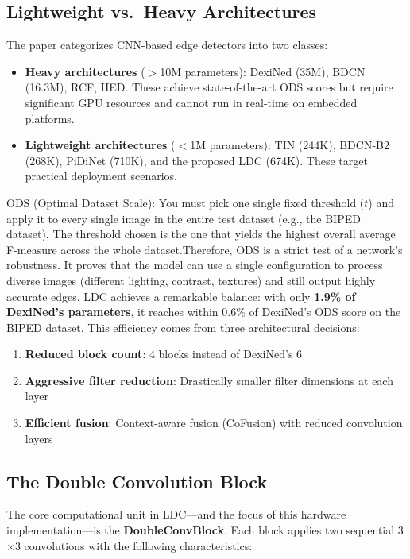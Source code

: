 \documentclass[11pt,a4paper]{report}
\begin{document}
\subsection{Lightweight vs.\ Heavy Architectures}

The paper categorizes CNN-based edge detectors into two classes:

\begin{itemize}[leftmargin=2em]
    \item \textbf{Heavy architectures} ($>$10M parameters): DexiNed (35M), BDCN (16.3M), RCF, HED. These achieve state-of-the-art ODS scores but require significant GPU resources and cannot run in real-time on embedded platforms.
    
    \item \textbf{Lightweight architectures} ($<$1M parameters): TIN (244K), BDCN-B2 (268K), PiDiNet (710K), and the proposed LDC (674K). These target practical deployment scenarios.
\end{itemize}
ODS (Optimal Dataset Scale): You must pick one single fixed threshold ($t$) and apply it to every single image in the entire test dataset (e.g., the BIPED dataset). The threshold chosen is the one that yields the highest overall average F-measure across the whole dataset.Therefore, ODS is a strict test of a network's robustness. It proves that the model can use a single configuration to process diverse images (different lighting, contrast, textures) and still output highly accurate edges.
LDC achieves a remarkable balance: with only \textbf{1.9\% of DexiNed's parameters}, it reaches within 0.6\% of DexiNed's ODS score on the BIPED dataset. This efficiency comes from three architectural decisions:

\begin{enumerate}[leftmargin=2em]
    \item \textbf{Reduced block count}: 4 blocks instead of DexiNed's 6
    \item \textbf{Aggressive filter reduction}: Drastically smaller filter dimensions at each layer
    \item \textbf{Efficient fusion}: Context-aware fusion (CoFusion) with reduced convolution layers
\end{enumerate}

\subsection{The Double Convolution Block}

The core computational unit in LDC---and the focus of this hardware implementation---is the \textbf{DoubleConvBlock}. Each block applies two sequential 3$\times$3 convolutions with the following characteristics:
\end{document}

